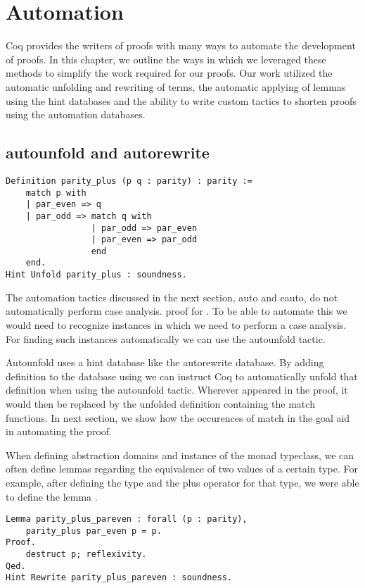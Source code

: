 \chapter{Automation}
Coq provides the writers of proofs with many ways to automate the development
of proofs. In this chapter, we outline the ways in which we leveraged these
methods to simplify the work required for our proofs. Our work utilized the
automatic unfolding and rewriting of terms, the automatic applying of lemmas
using the hint databases and the ability to write custom tactics to shorten 
proofs using the automation databases.

\section{autounfold and autorewrite}

\begin{verbatim}
Definition parity_plus (p q : parity) : parity :=
    match p with
    | par_even => q
    | par_odd => match q with
                 | par_odd => par_even
                 | par_even => par_odd
                 end
    end.
Hint Unfold parity_plus : soundness.
\end{verbatim}

The automation tactics discussed in the next section, auto and
eauto, do not automatically perform case analysis.
proof for . To be able to automate this we would need
to recognize instances in which we need to perform a case analysis. For finding
such instances automatically we can use the autounfold tactic.

Autounfold uses a hint database like the autorewrite database. By adding
definition to the database using  we can instruct Coq to
automatically unfold that definition when using the autounfold tactic. Wherever
 appeared in the proof, it would then be replaced by the
unfolded definition containing the match functions. In next section,
we show how the occurences of match in the goal aid in automating the proof.

When defining abstraction domains and instance of the monad typeclass, we can
often define lemmas regarding the equivalence of two values of a certain type.
For example, after defining the  type and the plus operator
for that type, we were able to define the lemma .

\begin{verbatim}
Lemma parity_plus_pareven : forall (p : parity),
    parity_plus par_even p = p.
Proof. 
    destruct p; reflexivity.
Qed.
Hint Rewrite parity_plus_pareven : soundness.
\end{verbatim}

